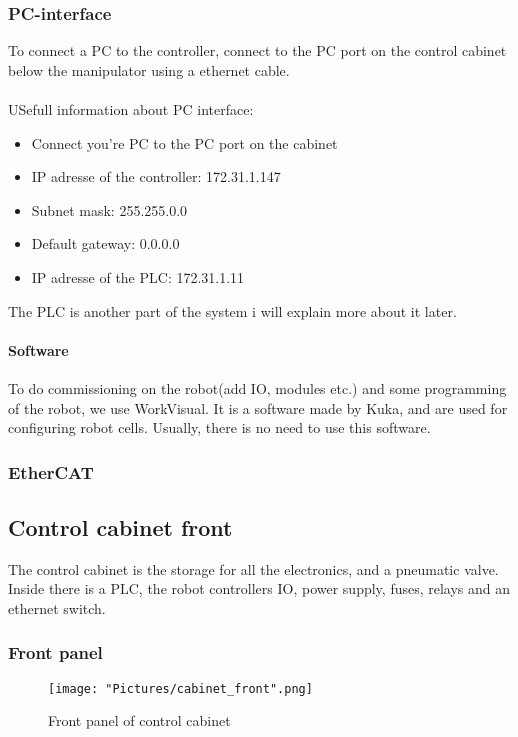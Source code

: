 \documentclass{article}
\begin{document}
        \subsubsection{PC-interface}
       To connect a PC to the controller, connect to the PC port on the control cabinet below the manipulator using a ethernet cable. 
        \\\\
        USefull information about PC interface:
        \begin{itemize}
            \item Connect you're PC to the PC port on the cabinet
            \item IP adresse of the controller: 172.31.1.147
            \item Subnet mask:                  255.255.0.0
            \item Default gateway:              0.0.0.0
            \item IP adresse of the PLC: 172.31.1.11 
        \end{itemize}
        The PLC is another part of the system i will explain more about it later. 
        \paragraph{Software}
         To do commissioning on the robot(add IO, modules etc.) and some programming of the robot, we use WorkVisual. It is a software made by Kuka, and are used for configuring robot cells. Usually, there is no need to use this software.
         
        \subsubsection{EtherCAT}
        
\newpage

    \subsection{Control cabinet front}
    The control cabinet is the storage for all the electronics, and a pneumatic valve. Inside there is a PLC, the robot controllers IO, power supply, fuses, relays and an ethernet switch.
        \subsubsection{Front panel}
        \begin{figure}[!h]
            \centering
            \texttt{[image: "Pictures/cabinet\_front".png]}
            \caption{Front panel of control cabinet}
        \end{figure}
        
\end{document}
